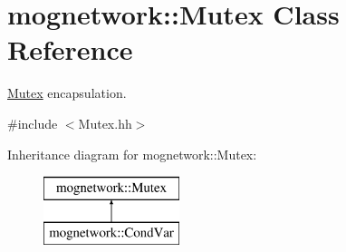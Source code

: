 \hypertarget{classmognetwork_1_1_mutex}{\section{mognetwork\-:\-:Mutex Class Reference}
\label{classmognetwork_1_1_mutex}
}


\hyperlink{classmognetwork_1_1_mutex}{Mutex} encapsulation.  




{\ttfamily \#include $<$Mutex.\-hh$>$}

Inheritance diagram for mognetwork\-:\-:Mutex\-:\begin{figure}[H]
\begin{center}
\leavevmode
\includegraphics[height=2.000000cm]{classmognetwork_1_1_mutex}
\end{center}
\end{figure}
